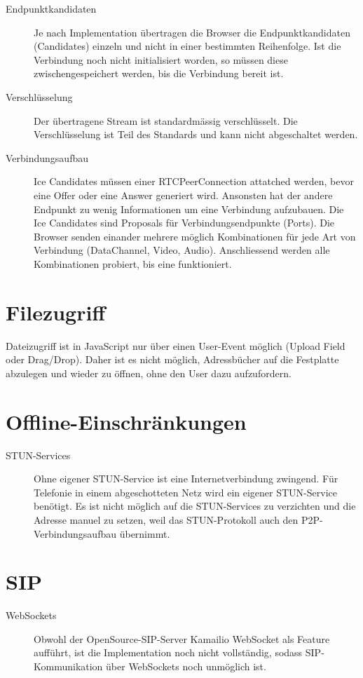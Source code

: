 	 	\begin{description}
			\item[Endpunktkandidaten] Je nach Implementation übertragen die Browser die Endpunktkandidaten (Candidates) einzeln und nicht in einer bestimmten Reihenfolge. Ist die Verbindung noch nicht initialisiert worden, so müssen diese zwischengespeichert werden, bis die Verbindung bereit ist.

			\item[Verschlüsselung] Der übertragene Stream ist standardmässig verschlüsselt. Die Verschlüsselung ist Teil des Standards und kann nicht abgeschaltet werden.
			
			\item[Verbindungsaufbau] Ice Candidates müssen einer RTCPeerConnection attatched werden, bevor eine Offer oder eine Answer generiert wird. Ansonsten hat der andere Endpunkt zu wenig Informationen um eine Verbindung aufzubauen. Die Ice Candidates sind Proposals für Verbindungsendpunkte (Ports). Die Browser senden einander mehrere möglich Kombinationen für jede Art von Verbindung (DataChannel, Video, Audio). Anschliessend werden alle Kombinationen probiert, bis eine funktioniert.
	 	\end{description}
	 
	 \section{Filezugriff}
	 	Dateizugriff ist in JavaScript nur über einen User-Event möglich (Upload
	 	Field oder Drag/Drop). Daher ist es nicht möglich, Adressbücher auf die
	 	Festplatte abzulegen und wieder zu öffnen, ohne den User dazu aufzufordern.
	 	
	 
	 \section{Offline-Einschränkungen}
	 	\begin{description}
			\item[STUN-Services] Ohne eigener STUN-Service ist eine Internetverbindung
			zwingend. Für Telefonie in einem abgeschotteten Netz wird ein eigener
			STUN-Service benötigt. Es ist nicht möglich auf die STUN-Services zu
			verzichten und die Adresse manuel zu setzen, weil das STUN-Protokoll auch den
			P2P-Verbindungsaufbau übernimmt.
	 	\end{description}
	 		
	 \section{SIP}
	 	\begin{description}
			\item[WebSockets] Obwohl der OpenSource-SIP-Server Kamailio WebSocket als Feature aufführt,
	 		ist die Implementation noch nicht vollständig, sodass SIP-Kommunikation über
	 		WebSockets noch unmöglich ist.
	 	\end{description}
	 		

